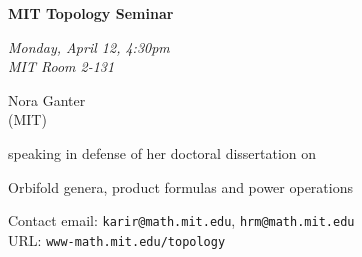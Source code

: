 \documentclass{slides}
\begin{document}
\begin{center}

{\fontsize {54pt}{40pt}\selectfont

\textrm{
{\textbf{MIT Topology Seminar}}}
}
\medskip


{\large\textrm{\emph{Monday, April 12, 4:30pm\\MIT Room 2-131}}}



\bigskip

\textrm{{\LARGE Nora Ganter  \\[.5cm](MIT)}}

\bigskip\bigskip\bigskip
\textrm{speaking in defense of her doctoral dissertation on}
\bigskip\bigskip\bigskip

\textrm{\LARGE Orbifold genera, product formulas and power operations}\\

\end{center}

\vspace{1cm}

{\small
\textrm{Contact email: } \texttt{karir@math.mit.edu}, \texttt{hrm@math.mit.edu}\\
\textrm{URL: } \texttt{www-math.mit.edu/topology}
}
\end{document}
